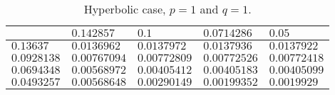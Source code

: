 \begin{table}[!ht]
{        \def\arraystretch{1.25}
        \begin{tabular}{ | C{2cm} || C{2cm} | C{2cm} | C{2cm} | C{2cm} | } %
            \hline
             & $\num{0.142857}$ & $\num{0.1}$ & $\num{0.0714286}$ & $\num{0.05}$ \\
            \hline
            \hline
            $\num{0.13637}$ & $\num{0.0136962}$ & $\num{0.0137972}$ & $\num{0.0137936}$ & $\num{0.0137922}$ \\
            $\num{0.0928138}$ & $\num{0.00767094}$ & $\num{0.00772809}$ & $\num{0.00772526}$ & $\num{0.00772418}$ \\
            $\num{0.0694348}$ & $\num{0.00568972}$ & $\num{0.00405412}$ & $\num{0.00405183}$ & $\num{0.00405099}$ \\
            $\num{0.0493257}$ & $\num{0.00568648}$ & $\num{0.00290149}$ & $\num{0.00199352}$ & $\num{0.0019929}$ \\
            \hline
        \end{tabular}
    }
    \caption{Hyperbolic case, $p = 1$ and $q = 1$.}
\end{table}
\vspace*{\fill}

\newpage

